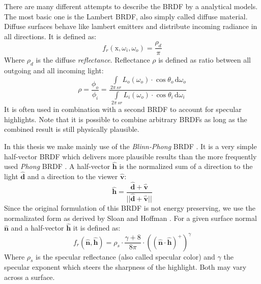 \documentclass[thesis.tex]{subfiles}
\begin{document}
There are many different attempts to describe the BRDF by a analytical models.
The most basic one is the Lambert BRDF, also simply called diffuse material.
Diffuse surfaces behave like lambert emitters and distribute incoming radiance in all directions.
It is defined as:
\begin{equation}
f_r(\mathrm{x}, \omega_i, \omega_o) = \frac{\rho_d}{\pi}
\end{equation}
Where $\rho_d$ is the diffuse \emph{reflectance}.
Reflectance $\rho$ is defined as ratio between all outgoing and all incoming light:
\begin{equation}
\rho = \frac{\phi_o}{\phi_i} = \frac{\int\limits_{2\pi\,sr} L_o(\omega_o)\cdot \cos\theta_o  \, \mathrm{d}\omega_o}{\int\limits_{2\pi\,sr} L_i(\omega_o)\cdot \cos\theta_i  \, \mathrm{d}\omega_i}
\end{equation}
It is often used in combination with a second BRDF to account for specular highlights.
Note that it is possible to combine arbitrary BRDFs as long as the combined result is still physically plausible.

In this thesis we make mainly use of the \emph{Blinn-Phong} BRDF \cite{bib:blinnphongbrdf}.
It is a very simple half-vector BRDF which delivers more plausible results than the more frequently used \emph{Phong} BRDF \cite[p.~251f]{bib:RealtimeRenderingBook}.
A half-vector $\hat{\mathbf{h}}$ is the normalized sum of a direction to the light $\hat{\mathbf{d}}$ and a direction to the viewer $\hat{\mathbf{v}}$:
\begin{equation}
\hat{\mathbf{h}} = \frac{\hat{\mathbf{d}} + \hat{\mathbf{v}}}{||\hat{\mathbf{d}} + \hat{\mathbf{v}}||}
\end{equation}
Since the original formulation of this BRDF is not energy preserving, we use the normalizated form as derived by Sloan and Hoffman \cite[p.~257]{bib:RealtimeRenderingBook}.
For a given surface normal $\hat{\mathbf{n}}$ and a half-vector $\hat{\mathbf{h}}$ it is defined as:
\begin{equation}
f_r(\hat{\mathbf{n}}, \hat{\mathbf{h}}) = \rho_s \cdot \frac{\gamma + 8}{8\pi} \cdot ((\hat{\mathbf{n}} \cdot \hat{\mathbf{h}})^+)^\gamma
\end{equation}
Where $\rho_s$ is the specular reflectance (also called specular color) and $\gamma$ the specular exponent which steers the sharpness of the highlight.
Both may vary across a surface.
\end{document}
